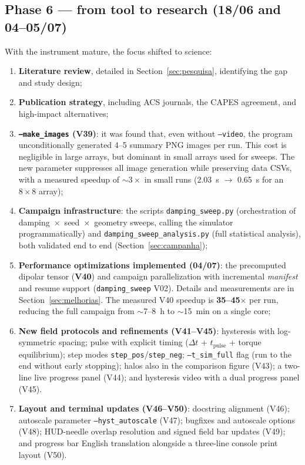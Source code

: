 \documentclass[11pt,a4paper]{article}
\newcommand{\code}[1]{\texttt{#1}}
\begin{document}
\subsection{Phase 6 --- from tool to research (18/06 and 04--05/07)}

With the instrument mature, the focus shifted to science:

\begin{enumerate}
\item \textbf{Literature review}, detailed in Section~\ref{sec:pesquisa}, identifying the gap and study design;
\item \textbf{Publication strategy}, including ACS journals, the CAPES agreement, and high-impact alternatives;
\item \textbf{\code{--make\_images} (V39)}: it was found that, even without \code{--video}, the program unconditionally generated 4--5 summary PNG images per run. This cost is negligible in large arrays, but dominant in small arrays used for sweeps. The new parameter suppresses all image generation while preserving data CSVs, with a measured speedup of $\sim 3\times$ in small runs (2.03~s $\to$ 0.65~s for an $8\times8$ array);
\item \textbf{Campaign infrastructure}: the scripts \code{damping\_sweep.py} (orchestration of damping~$\times$~seed~$\times$~geometry sweeps, calling the simulator programmatically) and \code{damping\_sweep\_analysis.py} (full statistical analysis), both validated end to end (Section~\ref{sec:campanha});
\item \textbf{Performance optimizations implemented (04/07)}: the precomputed dipolar tensor (\textbf{V40}) and campaign parallelization with incremental \emph{manifest} and resume support (\code{damping\_sweep} V02). Details and measurements are in Section~\ref{sec:melhorias}. The measured V40 speedup is \textbf{35--45$\times$} per run, reducing the full campaign from $\sim$7--8~h to $\sim$15~min on a single core;
\item \textbf{New field protocols and refinements (V41--V45)}: hysteresis with log-symmetric spacing; pulse with explicit timing ($\Delta t$ + $t_{\mathrm{pulse}}$ + torque equilibrium); step modes \code{step\_pos}/\code{step\_neg}; \code{--t\_sim\_full} flag (run to the end without early stopping); halos also in the comparison figure (V43); a two-line live progress panel (V44); and hysteresis video with a dual progress panel (V45).
\item \textbf{Layout and terminal updates (V46--V50)}: docstring alignment (V46); autoscale parameter \code{--hyst\_autoscale} (V47); bugfixes and autoscale options (V48); HUD-needle overlap resolution and signed field bar updates (V49); and progress bar English translation alongside a three-line console print layout (V50).
\end{enumerate}
\end{document}
